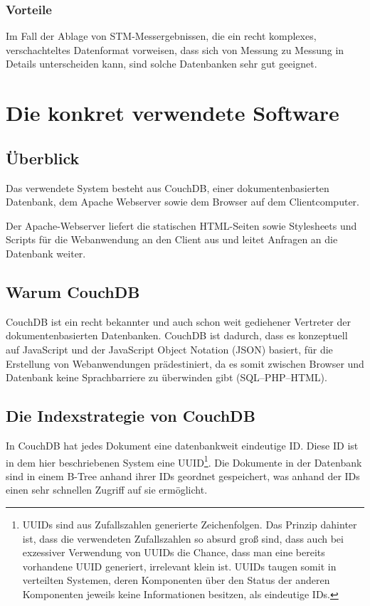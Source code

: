 \documentclass[12pt,ngerman,a4]{scrartcl}
\newcommand{\pquote}[1]{\glqq #1\grqq}
\begin{document}
\subsubsection{Vorteile}
Im Fall der Ablage von STM-Messergebnissen, die ein recht komplexes, verschachteltes Datenformat vorweisen, dass sich von Messung zu Messung in Details unterscheiden kann, sind solche Datenbanken sehr gut geeignet.

\section{Die konkret verwendete Software}
\subsection{Überblick}
Das verwendete System besteht aus CouchDB, einer dokumentenbasierten Datenbank, dem Apache Webserver sowie dem Browser auf dem Clientcomputer.

Der Apache-Webserver liefert die statischen HTML-Seiten sowie Stylesheets und Scripts für die Webanwendung an den Client aus und leitet Anfragen an die Datenbank weiter.
\subsection{Warum CouchDB}
CouchDB ist ein recht bekannter und auch schon weit gediehener Vertreter der dokumentenbasierten Datenbanken. CouchDB ist dadurch, dass es konzeptuell auf JavaScript und der JavaScript Object Notation (JSON) basiert, für die Erstellung von Webanwendungen prädestiniert, da es somit zwischen Browser und Datenbank keine \pquote{Sprachbarriere} zu überwinden gibt (SQL--PHP--HTML).
\subsection{Die Indexstrategie von CouchDB}
In CouchDB hat jedes Dokument eine datenbankweit eindeutige ID. Diese ID ist in dem hier beschriebenen System eine UUID\footnote{UUIDs sind aus Zufallszahlen generierte Zeichenfolgen. Das Prinzip dahinter ist, dass die verwendeten Zufallszahlen so absurd groß sind, dass auch bei exzessiver Verwendung von UUIDs die Chance, dass man eine bereits vorhandene UUID generiert, irrelevant klein ist. UUIDs taugen somit in verteilten Systemen, deren Komponenten über den Status der anderen Komponenten jeweils keine Informationen besitzen, als eindeutige IDs.}. Die Dokumente in der Datenbank sind in einem B-Tree anhand ihrer IDs geordnet gespeichert, was anhand der IDs einen sehr schnellen Zugriff auf sie ermöglicht.
\end{document}
